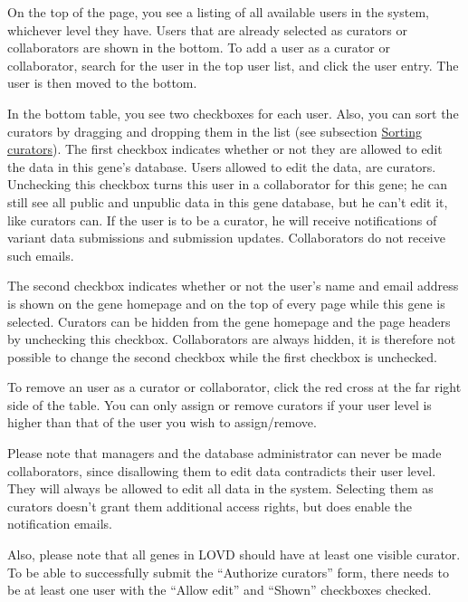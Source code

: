 \documentclass[a4paper,oneside,openany,12pt]{memoir}
\begin{document}
On the top of the page, you see a listing of all available users in the system, whichever level they have.
Users that are already selected as curators or collaborators are shown in the bottom.
To add a user as a curator or collaborator, search for the user in the top user list, and click the user entry.
The user is then moved to the bottom.
\par
In the bottom table, you see two checkboxes for each user.
Also, you can sort the curators by dragging and dropping them in the list (see subsection \hyperlink{ss_sorting_curators}{Sorting curators}).
The first checkbox indicates whether or not they are allowed to edit the data in this gene's database.
Users allowed to edit the data, are curators.
Unchecking this checkbox turns this user in a collaborator for this gene;
 he can still see all public and unpublic data in this gene database, but he can't edit it, like curators can.
If the user is to be a curator, he will receive notifications of variant data submissions and submission updates.
Collaborators do not receive such emails.
\par
The second checkbox indicates whether or not the user's name and email address is
 shown on the gene homepage and on the top of every page while this gene is selected.
Curators can be hidden from the gene homepage and the page headers by unchecking this checkbox.
Collaborators are always hidden, it is therefore not possible to change the second checkbox while the first checkbox is unchecked.
\par
To remove an user as a curator or collaborator, click the red cross at the far right side of the table.
You can only assign or remove curators if your user level is higher than that of the user you wish to assign/remove.
\\
\par
Please note that managers and the database administrator can never be made collaborators, since disallowing them to edit data contradicts their user level.
They will always be allowed to edit all data in the system.
Selecting them as curators doesn't grant them additional access rights, but does enable the notification emails.
\par
Also, please note that all genes in LOVD should have at least one visible curator.
To be able to successfully submit the ``Authorize curators'' form, there needs to be at least one user with the ``Allow edit'' and ``Shown'' checkboxes checked.



\hypertarget{ss_sorting_curators}{}
\end{document}
